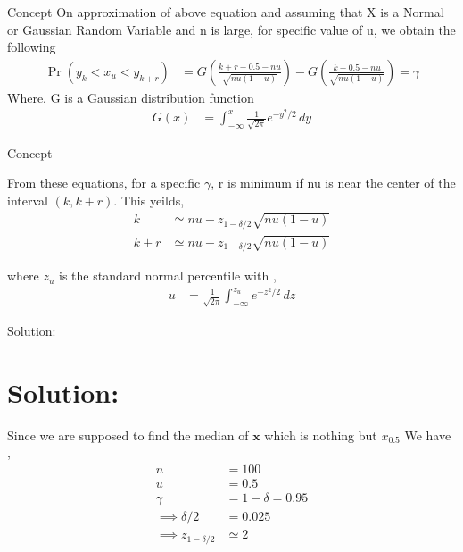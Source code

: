 \documentclass{beamer}
\providecommand{\pr}[1]{\ensuremath{\Pr\left(#1\right)}}
\theoremstyle{remark}
\numberwithin{equation}{subsection}
\let\vec\mathbf
\begin{document}
\begin{frame}{Concept}
    On approximation of above equation and assuming that X is a Normal or Gaussian Random Variable and n is large, for specific value of u,
    we obtain the following
    \begin{align}
        \pr{y_k < x_u < y_{k+r}} &= G(\frac{k + r - 0.5 - nu}{\sqrt{nu(1-u)}}) - G(\frac{k - 0.5 - nu}{\sqrt{nu(1-u)}}) = \gamma
     \end{align}
     Where, G is a Gaussian distribution function
     \begin{align}
         G(x) &= \int_{-\infty}^{x} \frac{1}{\sqrt{2\pi}} e^{-y^2/2} \, dy
     \end{align}
\end{frame}

\begin{frame}{Concept}

    From these equations, for a specific $\gamma$, r is minimum if nu is near the center of the interval $(k, k+r)$. This yeilds,
    \begin{align}
        k &\simeq nu-z_{1-\delta/2}\sqrt{nu(1-u)} \\
        k+r &\simeq nu-z_{1-\delta/2}\sqrt{nu(1-u)} 
    \end{align}
    
    where $z_u$ is the standard normal percentile with ,
\begin{align}
    u &= \frac{1}{\sqrt{2\pi}} \int_{-\infty}^{z_u} e^{-z^2/2} \, dz
\end{align}
\end{frame}

\begin{frame}{Solution:}

    \section{Solution:}
    Since we are supposed to find the median of $\vec{x}$ which is nothing but $x_{0.5}$ We have ,
    \begin{align}
        n &= 100 \\
        u &= 0.5 \\
        \gamma &= 1-\delta = 0.95 \\
        \implies \delta/2 &= 0.025\\
        \implies z_{1-\delta/2} &\simeq 2
    \end{align}
\end{frame}
\end{document}
